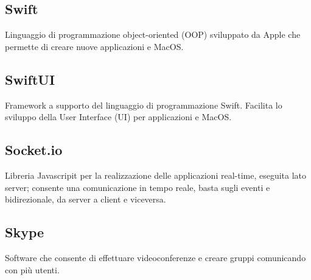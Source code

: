 \subsection*{Swift}
Linguaggio di programmazione object-oriented (OOP) sviluppato da Apple che permette di creare nuove applicazioni  e MacOS.  
\subsection*{SwiftUI}
Framework a supporto del linguaggio di programmazione Swift. Facilita lo sviluppo della User Interface (UI) per applicazioni  e MacOS.
\subsection*{Socket.io}
Libreria Javascripit per la realizzazione delle applicazioni real-time, eseguita lato server; consente una comunicazione in tempo reale, basta sugli eventi e bidirezionale, da server a client e viceversa. 

\subsection*{Skype}
Software che consente di effettuare videoconferenze e creare gruppi comunicando con più utenti.